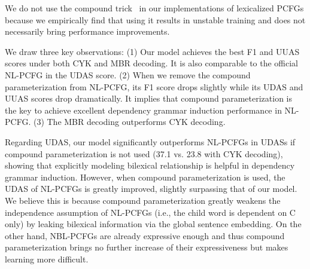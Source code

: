 \documentclass[11pt,a4paper]{article}
\begin{document}
We do not use the compound trick~\citep{kim-etal-2019-compound} in our implementations of lexicalized PCFGs because we empirically find that using it results in unstable training and does not necessarily bring performance improvements.





We draw three  key observations:
(1) Our model achieves the best F1 and UUAS scores under both CYK and MBR decoding. 
It is also comparable to the official NL-PCFG in the UDAS score.
(2) When we remove the compound parameterization from NL-PCFG, its F1 score drops slightly while its UDAS and UUAS scores drop dramatically. It implies that compound parameterization is the key to achieve excellent dependency grammar induction performance in NL-PCFG. 
(3) The MBR decoding outperforms CYK decoding. 



    Regarding UDAS, our model significantly outperforms NL-PCFGs in UDASs if compound parameterization is not used (37.1 vs. 23.8 with CYK decoding), showing that explicitly modeling bilexical relationship is helpful in dependency grammar induction. However, when compound parameterization is used, the UDAS of NL-PCFGs is greatly improved, slightly surpassing that of our model. We believe this is because compound parameterization greatly weakens the independence assumption of NL-PCFGs (i.e., the child word is dependent on C only) by leaking bilexical information via the global sentence embedding. On the other hand, NBL-PCFGs are already expressive enough and thus compound parameterization brings no further increase of their expressiveness but makes learning more difficult. 
\end{document}
